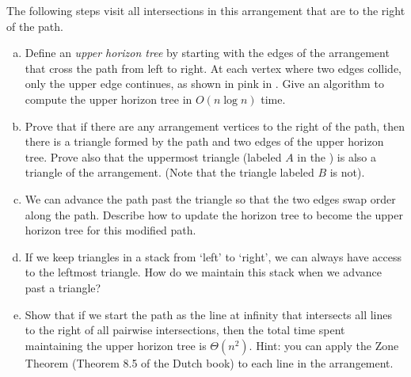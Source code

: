 \documentclass{article}
\begin{document}
The following steps
visit all intersections in this arrangement that are to the right of the path.

\begin{enumerate}[(a)]
    \item Define an \emph{upper horizon tree} by starting with the edges of the
        arrangement that cross the path from left to right. At each vertex where
        two edges collide, only the upper edge continues, as shown in pink in
        . Give an algorithm to
        compute the upper horizon tree in $O(n \log n)$ time.


    \item Prove that if there are any arrangement vertices to the right of the
        path, then there is a triangle formed by the path and two edges of the
        upper horizon tree.  Prove also that the uppermost triangle (labeled
        $A$ in the ) is also a triangle of the arrangement.  (Note that
        the triangle labeled $B$ is not).


    \item We can advance the path past the triangle so that the two edges swap
        order along the path.  Describe how to update the horizon tree to become
        the upper horizon tree for this modified path.


    \item If we keep triangles in a stack from `left' to `right', we can always have
        access to the leftmost triangle.  How do we maintain this stack when we
        advance past a triangle?


    \item Show that if we start the path as the line at infinity that intersects
        all lines to the right of all pairwise intersections, then
        the total time spent maintaining the upper horizon tree is
        $\Theta(n^2)$.  Hint: you can apply the Zone Theorem (Theorem 8.5 of the
        Dutch book) to each line in the arrangement.


\end{enumerate}
\end{document}
